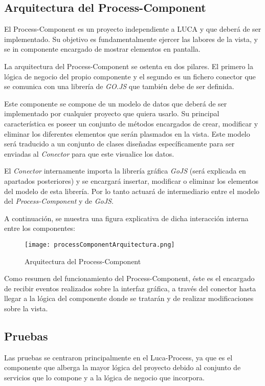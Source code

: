 \subsection{Arquitectura del Process-Component}

El Process-Component es un proyecto independiente a LUCA y que deberá de ser implementado. Su objetivo es fundamentalmente ejercer las labores de la vista, y se in componente encargado de mostrar elementos en pantalla.

La arquitectura del Process-Component se ostenta en dos pilares. El primero la lógica de negocio del propio componente y el segundo es un fichero conector que se comunica con una librería de \emph{GO.JS} que también debe de ser definida.

Este componente se compone de un modelo de datos que deberá de ser implementado por cualquier proyecto que quiera usarlo. Su principal característica es poseer un conjunto de métodos encargados de crear, modificar y eliminar los diferentes elementos que serán plasmados en la vista. Este modelo será traducido a un conjunto de clases diseñadas específicamente para ser enviadas al \emph{Conector} para que este visualice los datos.


El \emph{Conector} internamente importa la librería gráfica \emph{GoJS} (será explicada en apartados posteriores) y se encargará insertar, modificar o eliminar los elementos del modelo de esta librería. Por lo tanto actuará de intermediario entre el modelo del \emph{Process-Component} y de \emph{GoJS}.

A continuación, se muestra una figura explicativa de dicha interacción interna entre los componentes:

\begin{figure}[!tb]
	\centering
	\texttt{[image: processComponentArquitectura.png]}
	\caption{Arquitectura del Process-Component}\label{fig:processComponent}
\end{figure}

Como resumen del funcionamiento del Process-Component, éste es el encargado de recibir eventos realizados sobre la interfaz gráfica, a través del conector hasta llegar a la lógica del componente donde se tratarán y de realizar modificaciones sobre la vista.


\subsection{Pruebas}
	
	
	Las pruebas se centraron principalmente en el Luca-Process, ya que es el componente que alberga la mayor lógica del proyecto debido al conjunto de servicios que lo compone y a la lógica de negocio que incorpora.
	
